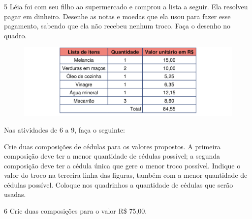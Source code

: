 \num{5} Léia foi com seu filho ao supermercado e comprou a lista a seguir. Ela
resolveu pagar em dinheiro. Desenhe as notas e moedas que ela usou para
fazer esse pagamento, sabendo que ela não recebeu nenhum troco. Faça o
desenho no quadro.


\begin{figure}[htpb!]
\centering
\includegraphics[width=.8\textwidth]{./media/image75.png}
\end{figure}
\vspace*{-1em}
\begin{mdframed}[linewidth=2pt,linecolor=salmao,roundcorner=10pt]
\vspace*{3em}
\end{mdframed}

Nas atividades de 6 a 9, faça o seguinte:

Crie duas composições de cédulas para os valores propostos. A primeira composição deve ter a menor quantidade de cédulas possível; a segunda composição deve ter a cédula única que gere o menor troco possível. Indique o valor do troco na terceira linha das figuras, também com a menor quantidade de cédulas possível. Coloque nos quadrinhos a quantidade de cédulas que serão usadas.



\num{6} Crie duas composições para o valor R\$ 75,00.

